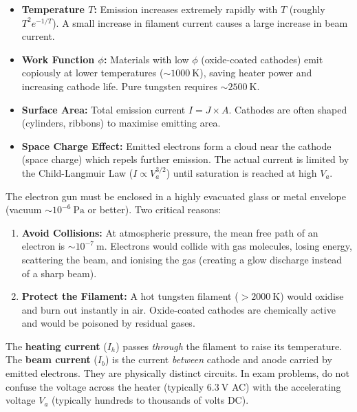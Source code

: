 \documentclass[11pt]{article}
\newcommand{\cle}[1]{{\popxbold\color{popdark}#1}}
\newcounter{popsec}
\newcounter{popsub}
\newcommand{\courssub}[1]{%
  \stepcounter{popsub}%
  \par\vspace{9pt}\noindent{\popxbold\fontsize{11.5}{13}\selectfont\color{popink}{\color{poporange}\thepopsec.\thepopsub}\hspace{6pt}#1}\par\nopagebreak\vspace{4pt}
}
\begin{document}
\begin{aretenir}
\begin{itemize}
\item \textbf{Temperature $T$:} Emission increases extremely rapidly with $T$ (roughly $T^2 e^{-1/T}$). A small increase in filament current causes a large increase in beam current.
\item \textbf{Work Function $\phi$:} Materials with low $\phi$ (oxide-coated cathodes) emit copiously at lower temperatures ($\sim 1000\ \mathrm{K}$), saving heater power and increasing cathode life. Pure tungsten requires $\sim 2500\ \mathrm{K}$.
\item \textbf{Surface Area:} Total emission current $I = J \times A$. Cathodes are often shaped (cylinders, ribbons) to maximise emitting area.
\item \textbf{Space Charge Effect:} Emitted electrons form a cloud near the cathode (space charge) which repels further emission. The actual current is limited by the \cle{Child-Langmuir Law} ($I \propto V_a^{3/2}$) until saturation is reached at high $V_a$.
\end{itemize}
\end{aretenir}

\courssub{The Vacuum Requirement}

The electron gun must be enclosed in a highly evacuated glass or metal envelope (vacuum $\sim 10^{-6}\ \mathrm{Pa}$ or better). Two critical reasons:

\begin{enumerate}
\item \textbf{Avoid Collisions:} At atmospheric pressure, the mean free path of an electron is $\sim 10^{-7}\ \mathrm{m}$. Electrons would collide with gas molecules, losing energy, scattering the beam, and ionising the gas (creating a glow discharge instead of a sharp beam).
\item \textbf{Protect the Filament:} A hot tungsten filament ($>2000\ \mathrm{K}$) would oxidise and burn out instantly in air. Oxide-coated cathodes are chemically active and would be poisoned by residual gases.
\end{enumerate}

\begin{attention}
The \textbf{heating current} ($I_h$) passes \emph{through} the filament to raise its temperature. The \textbf{beam current} ($I_b$) is the current \emph{between} cathode and anode carried by emitted electrons. They are physically distinct circuits. In exam problems, do not confuse the voltage across the heater (typically $6.3\ \mathrm{V}$ AC) with the accelerating voltage $V_a$ (typically hundreds to thousands of volts DC).
\end{attention}
\end{document}
